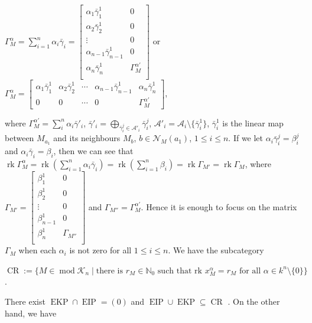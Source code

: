 \documentclass[a4paper,12pt]{amsart}
\newcommand{\cA}{\mathcal{A}}
\newcommand{\bg}{\bar{\gamma}}
\newcommand{\cN}{\mathcal{N}}
\DeclareMathOperator{\rk}{rk}
\DeclareMathOperator{\modd}{mod}
\DeclareMathOperator{\EIP}{EIP}
\DeclareMathOperator{\EKP}{EKP}
\DeclareMathOperator{\CR}{CR}
\begin{document}
\begin{center}


$\Gamma^{\alpha}_M=\sum^n_{i=1}\alpha_i\bg_i = \begin{bmatrix}
\alpha_1\bg^1_1 & 0\\
\alpha_2\bg^1_2 & 0\\
\vdots & 0\\
\alpha_{n-1}\bg^1_{n-1} & 0 \\
\alpha_n\bg^1_n & \Gamma^{\alpha'}_M \\

\end{bmatrix}$ or  $\Gamma^{\alpha}_M= \begin{bmatrix}
\alpha_1\bg^1_1 & \alpha_2\bg^1_2 & \cdots & \alpha_{n-1}\bg^1_{n-1} & \alpha_n\bg^1_n \\
0 & 0 & \cdots & 0  & \Gamma^{\alpha'}_M 
\end{bmatrix}$,
\end{center}
where  $\Gamma^{\alpha'}_M=\sum^{n}_i \alpha_i \bg'_i$, $\bg'_i=\bigoplus_{\bg^j_i\in \cA'_i}\bg^j_i$, $\cA'_i=\cA_i\setminus \{\bg^1_i\}$,   $\bg^1_i$ is the linear map between  $M_{a_1}$ and its neighbours $M_b$, $b\in \cN_M(a_1)$, $1\leq i\leq n$. If we let $\alpha_i\bg^j_i=\beta^j_i$ and $\alpha_i\bg_i=\beta_i$, then we can see that   $\rk \Gamma^{\alpha}_M=\rk(\sum^n_{i=1}\alpha_i\bg_i)=\rk(\sum^n_{i=1}\beta_i) =\rk \Gamma_{M'}=\rk \Gamma_M$, where 
$\Gamma_{M'}=\begin{bmatrix}
\beta^1_1 & 0\\
\beta^1_2 & 0\\
\vdots & 0\\
\beta^1_{n-1} & 0 \\
\beta^1_n & \Gamma_{M''} \\

\end{bmatrix}$ and $\Gamma_{M''}= \Gamma^{\alpha'}_M$. 
  Hence it is enough to focus on the matrix $\Gamma_M$ when each  $\alpha_i$ is not zero for all $1\leq i\leq n$.  We have the subcategory
\begin{center}
$ \CR:= \{M\in \modd \mathcal{K}_n\mid \text{there is } r_M\in \mathbb{N}_0 \text{ such that rk } x^{\alpha}_M=r_M \text{ for all } \alpha\in k^n\setminus \{0\} \}$.
\end{center}
 There exist  $\EKP \cap \EIP=(0)$ and $\EIP \cup \EKP\subseteq \CR$ \cite[2.4]{Julia}.  On the other hand, we have 
\end{document}

